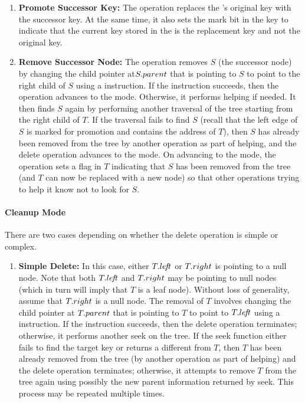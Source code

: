 \begin{limitscope}
\begin{enumerate}[leftmargin=*, noitemsep]
\item \textbf{Promote Successor Key:} The operation replaces the \targetnode's original key with the successor key. At the same time, it also sets the mark bit in the key to indicate that the current key stored in the \targetnode{} is the replacement key and not the original key.
\item \textbf{Remove Successor Node:}  The operation removes $S$ (the successor node) by changing the child pointer at$S.parent$ that is pointing to $S$ to point to the right child of $S$ using a \CAS{} instruction. If the \CAS{} instruction succeeds, then the operation advances to the \cleanup{} mode. Otherwise, it performs helping if needed. It 
then finds $S$ again by performing another traversal of the tree starting from the right child of $T$. If the traversal fails to find $S$ (recall that the left edge of $S$ is marked for promotion and contains the address of $T$), then $S$ has already been removed from the tree by another operation as part of helping, and the delete operation advances to the \cleanup{} mode. On advancing to the \cleanup{} mode, the operation sets a flag in $T$  indicating that $S$ has been removed from the tree (and $T$ can now be replaced with a new node) so that other operations trying to help it know not to look for $S$.
\end{enumerate}



\paragraph*{Cleanup Mode}
There are two cases depending on whether the delete operation is simple or complex. 

\begin{enumerate}[leftmargin=*, label=(\alph*), noitemsep]

\item \textbf{Simple Delete:}
In this case, either $T.le\!f\!t$ or $T.right$ is pointing to a null node. Note that both $T.le\!f\!t$ and $T.right$ may be pointing to null nodes (which in turn will imply that $T$ is a leaf node). Without loss of generality, assume that $T.right$ is a null node. The removal of $T$ involves changing the child pointer at $T.parent$ that is pointing to $T$ to point to $T.le\!f\!t$ using a \CAS{} instruction. If the \CAS{} instruction succeeds, then the delete operation terminates; otherwise,  it performs another seek on the tree. If the seek function either fails to find the target key or returns a \terminalnode{} different from $T$, then $T$ has been already removed from the tree (by another operation as part of helping) and the delete operation terminates; otherwise, it attempts to remove $T$ from the tree again using possibly the new parent information returned by seek. This process may be repeated multiple times. 


\end{enumerate}
\end{limitscope}
